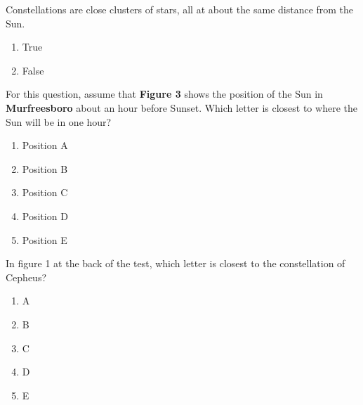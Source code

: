 \documentclass[11pt]{article}
\begin{document}
\begin{enumerate}
\setlength{\itemsep}{1pt} 
\setlength{\parskip}{0pt} 
\setlength{\parsep}{0pt}
\setlength{\multicolsep}{1pt} 

\begin{minipage}{\textwidth}
\begin{minipage}{\textwidth}
\item Constellations are close clusters of stars, all at about the same distance from the Sun.
\begin{multicols}{3}
\begin{enumerate} 
\setlength{\itemsep}{1pt} 
\setlength{\parskip}{0pt} 
\setlength{\parsep}{0pt}
\setlength{\multicolsep}{1pt} 
\item True
\item False
\end{enumerate} 
\vfill 
\end{multicols}

\end{minipage}
\end{minipage}
\vskip 0.20in

\begin{minipage}{\textwidth}
\begin{minipage}{\textwidth}
\item For this question, assume that {\bf Figure 3} shows the position of the Sun in {\bf Murfreesboro} about an hour before Sunset.   Which letter is closest to where the Sun will be in one hour?
\begin{multicols}{3}
\begin{enumerate} 
\setlength{\itemsep}{1pt} 
\setlength{\parskip}{0pt} 
\setlength{\parsep}{0pt}
\setlength{\multicolsep}{1pt} 
\item Position A
\item Position B
\item Position C
\item Position D
\item Position E
\end{enumerate} 
\vfill 
\end{multicols}

\end{minipage}
\end{minipage}
\vskip 0.20in

\begin{minipage}{\textwidth}
\begin{minipage}{\textwidth}
\item In figure 1 at the back of the test, which letter is closest to the constellation of Cepheus?
\begin{multicols}{3}
\begin{enumerate} 
\setlength{\itemsep}{1pt} 
\setlength{\parskip}{0pt} 
\setlength{\parsep}{0pt}
\setlength{\multicolsep}{1pt} 
\item A
\item B
\item C
\item D
\item E
\end{enumerate} 
\vfill 
\end{multicols}


\end{minipage}
\end{minipage}
\end{enumerate}
\end{document}
